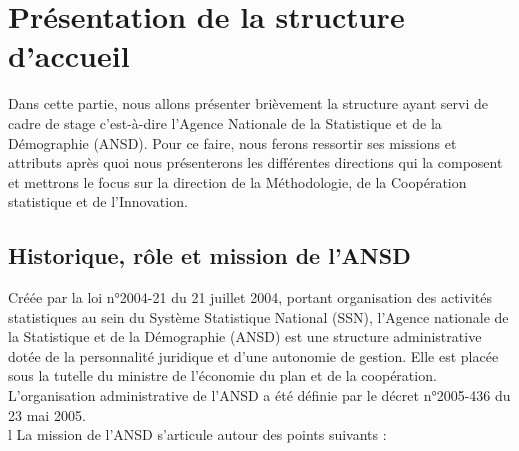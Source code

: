 \chapter{Présentation de la structure d'accueil}

\begin{simplebox2}
Dans cette partie, nous allons présenter brièvement la structure ayant servi de cadre de stage c’est-à-dire l’Agence Nationale de la Statistique et de la Démographie (ANSD). Pour ce faire, nous ferons ressortir ses missions et attributs après quoi nous présenterons les différentes directions qui la composent et mettrons le focus sur la direction de la Méthodologie, de la Coopération statistique et de l'Innovation.
\end{simplebox2}

\section{Historique, rôle et mission de l'ANSD}

Créée par la loi n°2004-21 du 21 juillet 2004, portant organisation des activités statistiques au sein du Système Statistique National (SSN), l’Agence nationale de la Statistique et de la Démographie (ANSD) est une structure administrative dotée de la personnalité juridique et d'une autonomie de gestion. Elle est placée sous la tutelle du ministre de l'économie du plan et de la coopération. L’organisation administrative de l'ANSD a été définie par le décret n°2005-436 du 23 mai 2005.\\
l
La mission de l’ANSD s’articule autour des points suivants :

